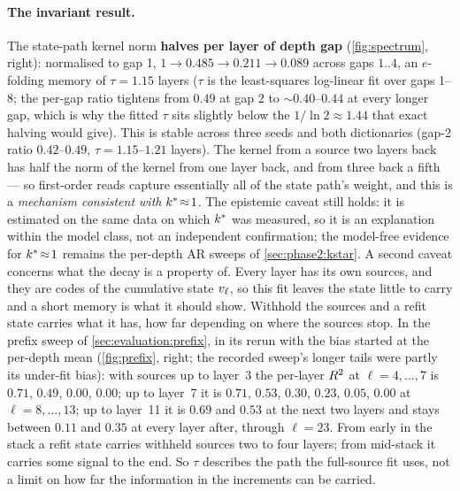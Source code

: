 \paragraph{The invariant result.}
The state-path kernel norm \textbf{halves per layer of depth gap}
(\cref{fig:spectrum}, right): normalised
to gap 1, $1 \to \mathbf{0.485} \to 0.211 \to 0.089$ across gaps $1..4$, an
$e$-folding memory of $\tau = \mathbf{1.15}$ layers ($\tau$ is the
least-squares log-linear fit over gaps 1--8; the per-gap ratio tightens from
$0.49$ at gap 2 to ${\sim}0.40$--$0.44$ at every longer gap, which is why the fitted
$\tau$ sits slightly below the $1/\ln 2 \approx 1.44$ that exact halving would
give). This is stable across
three seeds and both dictionaries (gap-2 ratio $0.42$--$0.49$, $\tau =
1.15$--$1.21$ layers). The kernel from a source two layers back has half the
norm of the kernel from one layer back, and from three back a fifth --- so
first-order reads capture essentially all of the state path's weight, and
this is a \emph{mechanism consistent with}
$k^{\ast}\!\approx\!1$. The epistemic caveat still holds: it is estimated on the
same data on which $k^{\ast}$ was measured, so it is an explanation within the
model class, not an independent confirmation; the model-free evidence for
$k^{\ast}\!\approx\!1$ remains the per-depth AR sweeps of
\cref{sec:phase2:kstar}. A second caveat concerns what the decay is a
property of. Every layer has its own sources, and they are codes of the
cumulative state $v_\ell$, so this fit leaves the state little to carry and a
short memory is what it should show. Withhold the sources and a refit state
carries what it has, how far depending on where the sources stop. In the
prefix sweep of \cref{sec:evaluation:prefix}, in its rerun with the bias
started at the per-depth mean (\cref{fig:prefix}, right; the recorded
sweep's longer tails were partly its under-fit bias): with sources up to layer~3 the per-layer $R^2$ at
$\ell = 4,\dots,7$ is $0.71$, $0.49$, $0.00$, $0.00$; up to layer~7 it is
$0.71$, $0.53$, $0.30$, $0.23$, $0.05$, $0.00$ at $\ell = 8,\dots,13$; up to
layer~11 it is $0.69$ and $0.53$ at the next two layers and stays between
$0.11$ and $0.35$ at every layer after, through $\ell = 23$. From early in
the stack a refit state carries withheld sources two to four layers; from
mid-stack it carries some signal to the end. So $\tau$ describes the path
the full-source fit uses, not a limit on how far the information in the
increments can be carried.

